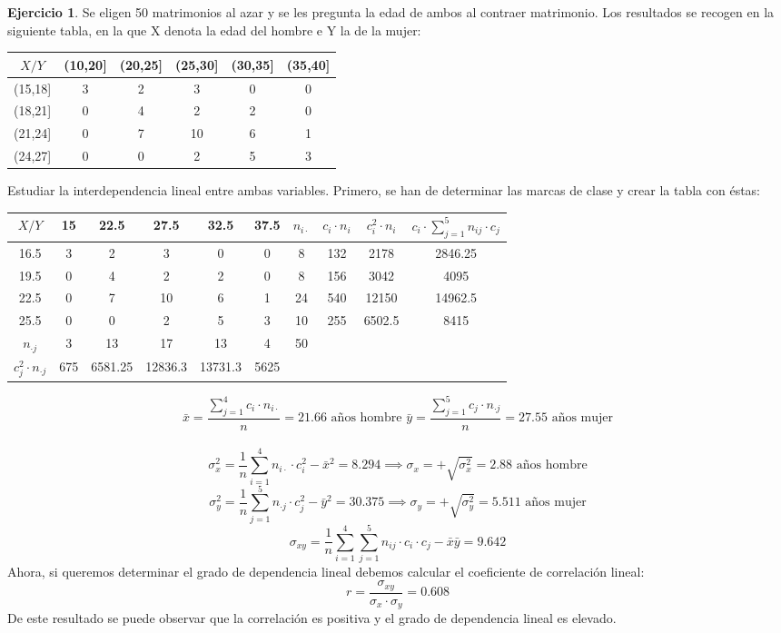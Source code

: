 \documentclass[a4paper, 12pt]{article}
\theoremstyle{definition}
\newtheorem{ej}{Ejercicio}
\begin{document}
\begin{ej}
Se eligen 50 matrimonios al azar y se les pregunta la edad de ambos al contraer matrimonio. Los resultados se recogen en la siguiente tabla, en la que X denota la edad del hombre e Y la de la mujer:
\begin{center}
\begin{tabular}{c|ccccc}
	\(X/Y\) & (10,20] & (20,25] & (25,30] & (30,35] & (35,40] \\
	\hline
	(15,18] & 3 & 2 & 3 & 0 & 0 \\
	(18,21] & 0 & 4 & 2 & 2 & 0 \\
	(21,24] & 0 & 7 & 10 & 6 & 1\\
	(24,27] & 0 & 0 & 2 & 5 & 3\\
\end{tabular}
\end{center}
Estudiar la interdependencia lineal entre ambas variables.
Primero, se han de determinar las marcas de clase y crear la tabla con éstas:
\begin{center}
\begin{tabular}{c|ccccccccc}
	\(X/Y\) & 15 & 22.5 & 27.5 & 32.5 & 37.5 & $n_{i \cdot} $ & $c_i \cdot n_i$ & $c_i^2 \cdot n_i$ & $c_i \cdot \displaystyle\sum_{j=1}^5 n_{ij}\cdot c_j$\\
	\hline
	16.5 & 3 & 2 & 3 & 0 & 0 & 8 & 132 & 2178 & 2846.25 \\
	19.5 & 0 & 4 & 2 & 2 & 0 & 8 & 156 & 3042 & 4095 \\
	22.5 & 0 & 7 & 10 & 6 & 1 & 24 & 540 & 12150 & 14962.5 \\
	25.5 & 0 & 0 & 2 & 5 & 3 & 10 & 255 & 6502.5 & 8415 \\
	$n_{\cdot j}$ & 3 & 13 & 17 & 13 & 4 & 50 &  &  & \vline 30318.75 \vline \\
	$c_j^2 \cdot n_{\cdot j}$ & 675 & 6581.25 & 12836.3 & 13731.3 & 5625 &  &  &  &  \\
\end{tabular}
\end{center}
$$\bar{x} = \dfrac{\displaystyle\sum_{j=1}^4 c_i \cdot n_{i \cdot}}{n} = 21.66 \text{ años hombre   } \bar{y} = \dfrac{\displaystyle\sum_{j=1}^5 c_j \cdot n_{\cdot j}}{n} = 27.55 \text{ años mujer}$$
\\
$$\sigma_x^2 = \frac{1}{n}\displaystyle\sum_{i=1}^4 n_{i \cdot} \cdot c_i^2 - \bar{x}^2 = 8.294 \implies \sigma_x = +\sqrt{\sigma_x^2} = 2.88 \text{ años hombre}$$
$$\sigma_y^2 = \frac{1}{n}\displaystyle\sum_{j=1}^5 n_{\cdot j} \cdot c_j^2 - \bar{y}^2 = 30.375 \implies \sigma_y = +\sqrt{\sigma_y^2} = 5.511 \text{ años mujer}$$
$$\sigma_{xy} = \frac{1}{n} \displaystyle \sum_{i=1}^4 \sum_{j=1}^5 n_{ij} \cdot c_i \cdot c_j -\bar{x}\bar{y} = 9.642$$
Ahora, si queremos determinar el grado de dependencia lineal debemos calcular el coeficiente de correlación lineal:
$$r = \dfrac{\sigma_{xy}}{\sigma_x \cdot \sigma_y} = 0.608$$
De este resultado se puede observar que la correlación es positiva y el grado de dependencia lineal es elevado.
\end{ej}
\end{document}
